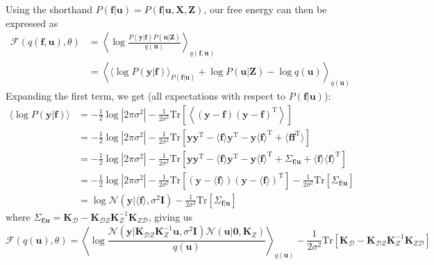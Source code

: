 \documentclass[a4paper]{article}
\begin{document}
Using the shorthand $P(\mathbf{f}|\mathbf{u}) = P(\mathbf{f}|\mathbf{u,X,Z})$, our free energy can then be expressed as
\begin{align*}
\mathcal{F}(q(\mathbf{f,u}),\theta) &= \left\langle \log \frac{P(\mathbf{y}|\mathbf{f}) P(\mathbf{u}|\mathbf{Z})}{q(\mathbf{u})} \right\rangle_{q(\mathbf{f,u})} \\
&= \left\langle \langle\log P(\mathbf{y}|\mathbf{f})\rangle_{P(\mathbf{f}|\mathbf{u})} + \log P(\mathbf{u}|\mathbf{Z}) - \log q(\mathbf{u}) \right\rangle_{q(\mathbf{u})}
\end{align*}
Expanding the first term, we get (all expectations with respect to $P(\mathbf{f}|\mathbf{u})$):
\begin{align*}
\langle\log P(\mathbf{y}|\mathbf{f})\rangle &= -\frac{1}{2}\log|2\pi\sigma^2| - \frac{1}{2\sigma^2}\textrm{Tr}\left[\left\langle(\mathbf{y} - \mathbf{f})(\mathbf{y} - \mathbf{f})^\textrm{T}\right\rangle\right] \\
&= -\frac{1}{2}\log|2\pi\sigma^2| - \frac{1}{2\sigma^2}\textrm{Tr}\left[\mathbf{yy}^\textrm{T} - \langle \mathbf{f}\rangle \mathbf{y}^\textrm{T} - \mathbf{y}\langle \mathbf{f} \rangle^\textrm{T} + \langle \mathbf{ff}^\textrm{T}\rangle\right] \\
&= -\frac{1}{2}\log|2\pi\sigma^2| - \frac{1}{2\sigma^2}\textrm{Tr}\left[\mathbf{yy}^\textrm{T} - \langle \mathbf{f}\rangle \mathbf{y}^\textrm{T} - \mathbf{y}\langle \mathbf{f} \rangle^\textrm{T} + \Sigma_{\mathbf{f}|\mathbf{u}} + \langle \mathbf{f} \rangle\langle \mathbf{f} \rangle^\textrm{T}\right] \\
&= -\frac{1}{2}\log|2\pi\sigma^2| - \frac{1}{2\sigma^2}\textrm{Tr}\left[(\mathbf{y} - \langle\mathbf{f}\rangle)(\mathbf{y} - \langle\mathbf{f}\rangle)^\textrm{T}\right] - \frac{1}{2\sigma^2}\textrm{Tr}\left[\Sigma_{\mathbf{f}|\mathbf{u}}\right] \\
&= \log\mathcal{N}(\mathbf{y}|\langle\mathbf{f}\rangle, \sigma^2 \mathbf{I}) - \frac{1}{2\sigma^2}\textrm{Tr}\left[\Sigma_{\mathbf{f}|\mathbf{u}}\right]
\end{align*}
where $\Sigma_{\mathbf{f}|\mathbf{u}} = \mathbf{K}_\mathcal{D} - \mathbf{K}_{\mathcal{D}Z}\mathbf{K}_Z^{-1}\mathbf{K}_{Z\mathcal{D}}$, giving us
\[\mathcal{F}(q(\mathbf{u}),\theta) = \left\langle \log \frac{\mathcal{N}(\mathbf{y}|\mathbf{K}_{\mathcal{D}Z}\mathbf{K}_Z^{-1}\mathbf{u},\sigma^2 \mathbf{I}) \mathcal{N}(\mathbf{u}|\mathbf{0},\mathbf{K}_Z)}{q(\mathbf{u})} \right\rangle_{q(\mathbf{u})} - \frac{1}{2\sigma^2}\textrm{Tr}\left[\mathbf{K}_\mathcal{D} - \mathbf{K}_{\mathcal{D}Z}\mathbf{K}_Z^{-1}\mathbf{K}_{Z\mathcal{D}}\right] \]
\end{document}

